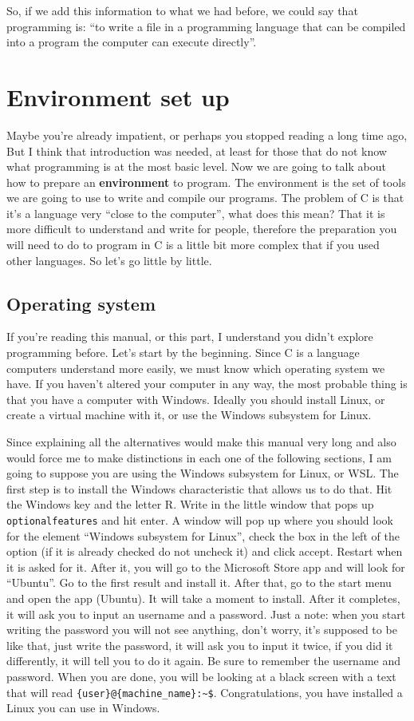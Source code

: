 \documentclass[a4paper]{article}
\begin{document}
So, if we add this information to what we had before, we could say that
programming is: ``to write a file in a programming language that can be
compiled into a program the computer can execute directly''.

\section{Environment set up}
Maybe you're already impatient, or perhaps you stopped reading a long time
ago, But I think that introduction was needed, at least for those that do not
know what programming is at the most basic level. Now we are going to talk about
how to prepare an \textbf{environment} to program. The environment is the set of
tools we are going to use to write and compile our programs.
The problem of C is that it's a language very ``close to the computer'', what
does this mean? That it is more difficult to understand and write for people,
therefore the preparation you will need to do to program in C is a little bit
more complex that if you used other languages. So let's go little by little.

\subsection{Operating system}
If you're reading this manual, or this part, I understand you didn't explore
programming before. Let's start by the beginning. Since C is a language
computers understand more easily, we must know which operating system we have.
If you haven't altered your computer in any way, the most probable thing is
that you have a computer with Windows. Ideally you should install Linux, or
create a virtual machine with it, or use the Windows subsystem for
Linux.

Since explaining all the alternatives would make this manual very long and also
would force me to make distinctions in each one of the following sections, I am
going to suppose you are using the Windows subsystem for Linux, or WSL. The
first step is to install the Windows characteristic that allows us to
do that. Hit the Windows key and the letter R. Write in the little window that
pops up \verb!optionalfeatures! and hit enter. A window will pop up
where you should look for the element ``Windows subsystem for Linux'', check
the box in the left of the option (if it is already checked do not uncheck it)
and click accept. Restart when it is asked for it.
After it, you will go to the Microsoft Store app and will look for ``Ubuntu''.
Go to the first result and install it. After that, go to the start menu and
open the app (Ubuntu). It will take a moment to install. After it completes,
it will ask you to input an username and a password. Just a note: when you start
writing the password you will not see anything, don't worry, it's supposed to
be like that, just write the password, it will ask you to input it twice, if
you did it differently, it will tell you to do it again. Be sure to remember
the username and password. When you are done, you will be looking at a black
screen with a text that will read \verb!{user}@{machine_name}:~$!.
Congratulations, you have installed a Linux you can use in Windows.
\end{document}
